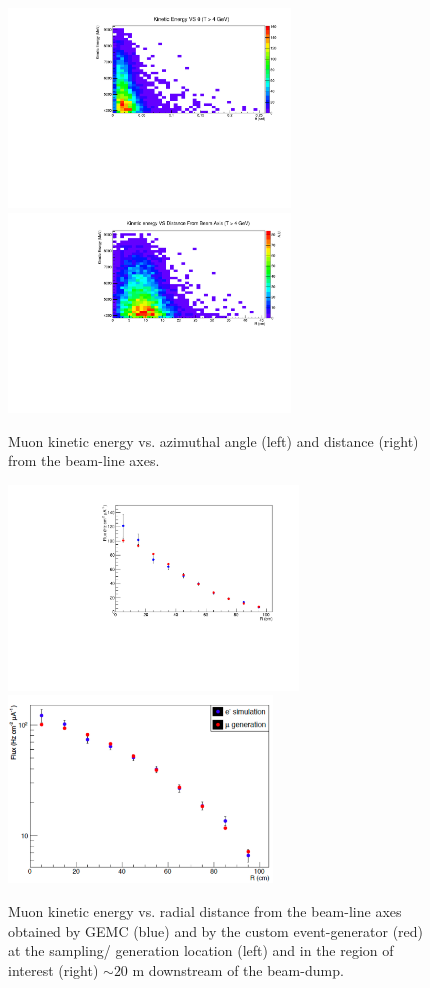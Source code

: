 \begin{figure}[h!] 
\center
\includegraphics[width=7.5cm]{figs/EkinVStheta.pdf}
\includegraphics[width=7.5cm]{figs/EkinVSR.pdf}
\caption{Muon kinetic energy vs. azimuthal angle (left) and distance (right) from the beam-line axes.}
\label{fig:mu-sampling}
\end{figure}
\begin{figure}[h!] 
\center
\includegraphics[width=7.7cm]{figs/SimVSGen.pdf}
\includegraphics[width=7.0cm]{figs/mu-comp-far.pdf}
\caption{Muon kinetic energy vs. radial  distance from the beam-line axes obtained by GEMC (blue) and by the custom event-generator (red) at the sampling/ generation location (left) and in the region of interest (right) $\sim 20$ m downstream of the beam-dump.}
\label{fig:mu-sampling-extract} 
\end{figure}


